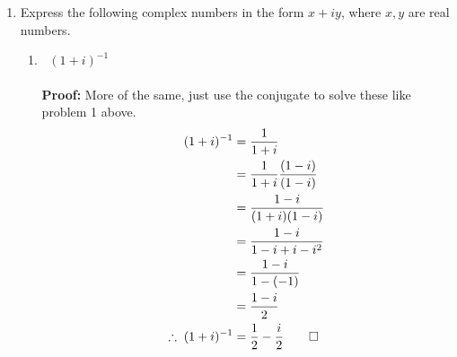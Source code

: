 \begin{enumerate}
	\item Express the following complex numbers in the form $x + iy$, where $x, y$ are real numbers.
	\begin{enumerate}
		\item $\;\;(1 + i)^{-1}$ \\
		\\
		\textbf{Proof:} More of the same, just use the conjugate to solve these like problem 1 above.
		\begin{align*}
		(1 + i)^{-1} &= \frac{1}{1 + i} \\
		&= \frac{1}{1 + i} \frac{(1 - i)}{(1 - i)} \\
		&= \frac{1 - i}{(1 + i)(1 - i)} \\
		&= \frac{1 - i}{1 - i + i - i^2} \\
		&= \frac{1 - i}{1 - (-1)} \\
		&= \frac{1 - i}{2} \\
		\therefore \; (1 + i)^{-1} &= \frac{1}{2} - \frac{i}{2} \qed
		\end{align*}
	\end{enumerate}
	

\end{enumerate}
